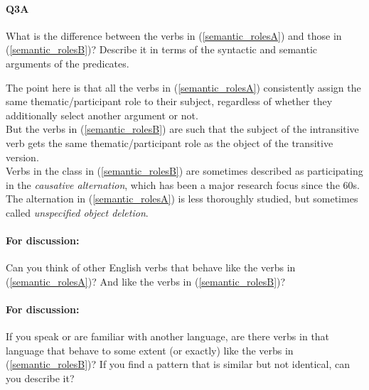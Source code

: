 \documentclass{article}
\begin{document}
\paragraph{Q3A} What is the difference between the verbs in (\ref{semantic_rolesA}) and those in (\ref{semantic_rolesB})? Describe it in terms of the syntactic and semantic arguments of the predicates.

\begin{answer}
{
The point here is that all the verbs in (\ref{semantic_rolesA}) consistently assign the same thematic/participant role to their subject, regardless of whether they additionally select another argument or not.\\
But the verbs in (\ref{semantic_rolesB}) are such that the subject of the intransitive verb gets the same thematic/participant role as the object of the transitive version.\\
Verbs in the class in (\ref{semantic_rolesB}) are sometimes described as participating in the \emph{causative alternation}, which has been a major research focus since the 60s.\\
The alternation in (\ref{semantic_rolesA}) is less thoroughly studied, but sometimes called \emph{unspecified object deletion}.
}
\end{answer}

\paragraph{For discussion:} Can you think of other English verbs that behave like the verbs in (\ref{semantic_rolesA})? And like the verbs in (\ref{semantic_rolesB})?

\paragraph{For discussion:} If you speak or are familiar with another language, are there verbs in that language that behave to some extent (or exactly) like the verbs in (\ref{semantic_rolesB})? If you find a pattern that is similar but not identical, can you describe it?
\end{document}
